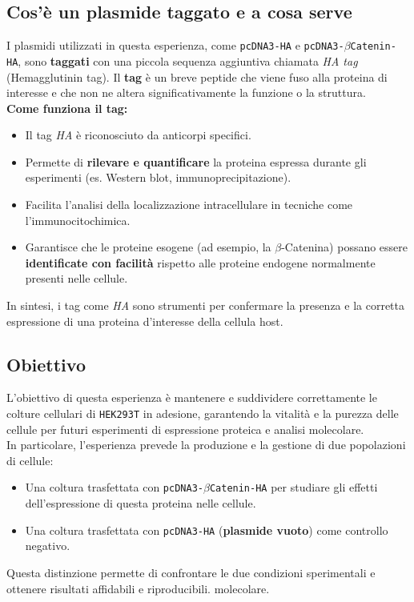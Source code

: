 \subsection{Cos'è un plasmide taggato e a cosa serve}

I plasmidi utilizzati in questa esperienza, come \texttt{pcDNA3-HA} e \texttt{pcDNA3-$\beta$Catenin-HA}, sono \textbf{taggati} con una piccola sequenza aggiuntiva chiamata \textit{HA tag} (Hemagglutinin tag).  
Il \textbf{tag} è un breve peptide che viene fuso alla proteina di interesse e che non ne altera significativamente la funzione o la struttura.  
\vspace{0.5em}\\
\textbf{Come funziona il tag:}
\begin{itemize}\footnotesize
  \item Il tag \textit{HA} è riconosciuto da anticorpi specifici.
  \item Permette di \textbf{rilevare e quantificare} la proteina espressa durante gli esperimenti (es. Western blot, immunoprecipitazione).
  \item Facilita l’analisi della localizzazione intracellulare in tecniche come l’immunocitochimica.
  \item Garantisce che le proteine esogene (ad esempio, la $\beta$-Catenina) possano essere \textbf{identificate con facilità} rispetto alle proteine endogene normalmente presenti nelle cellule.
\end{itemize}

In sintesi, i tag come \textit{HA} sono strumenti per confermare la presenza e la corretta espressione di una proteina d'interesse della cellula host.

\newpage
\subsection{Obiettivo}
L’obiettivo di questa esperienza è mantenere e suddividere correttamente le colture cellulari di \texttt{HEK293T} in adesione, garantendo la vitalità e la purezza delle cellule per futuri esperimenti di espressione proteica e analisi molecolare.
\vspace{0.5em}\\
In particolare, l’esperienza prevede la produzione e la gestione di due popolazioni di cellule:
\begin{itemize}\footnotesize
  \item Una coltura trasfettata con \texttt{pcDNA3-$\beta$Catenin-HA} per studiare gli effetti dell’espressione di questa proteina nelle cellule.
  \item Una coltura trasfettata con \texttt{pcDNA3-HA} (\textbf{plasmide vuoto}) come controllo negativo.
\end{itemize}
Questa distinzione permette di confrontare le due condizioni sperimentali e ottenere risultati affidabili e riproducibili.
molecolare.\\
\vspace{0.5em}
